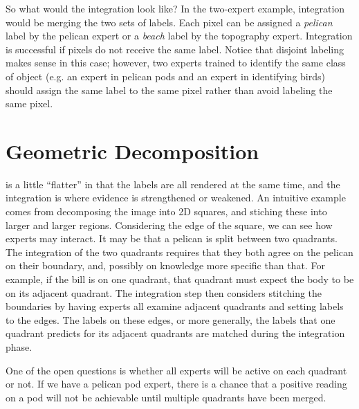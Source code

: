 So what would the integration look like? In the two-expert example, integration
would be merging the two sets of labels. Each pixel can be assigned a
\emph{pelican} label by the pelican expert or a \emph{beach} label by the
topography expert. Integration is successful if pixels do not receive the same
label. Notice that disjoint labeling makes sense in this case; however, two
experts trained to identify the same class of object (e.g. an expert in pelican
pods and an expert in identifying birds) should assign the same label to the
same pixel rather than avoid labeling the same pixel.

\section{Geometric Decomposition}

 is a little ``flatter'' in that the labels
are all rendered at the same time, and the integration is where evidence is
strengthened or weakened. An intuitive example comes from decomposing the image
into 2D squares, and stiching these into larger and larger regions. Considering
the edge of the square, we can see how experts may interact. It may be that a
pelican is split between two quadrants. The integration of the two quadrants
requires that they both agree on the pelican on their boundary, and, possibly
on knowledge more specific than that. For example, if the bill is on one
quadrant, that quadrant must expect the body to be on its adjacent quadrant.
The integration step then considers stitching the boundaries by having experts
all examine adjacent quadrants and setting labels to the edges. The labels on
these edges, or more generally, the labels that one quadrant predicts for its
adjacent quadrants are matched during the integration phase.

One of the open questions is whether all experts will be active on each
quadrant or not. If we have a pelican pod expert, there is a chance that a
positive reading on a pod will not be achievable until multiple quadrants have
been merged.
